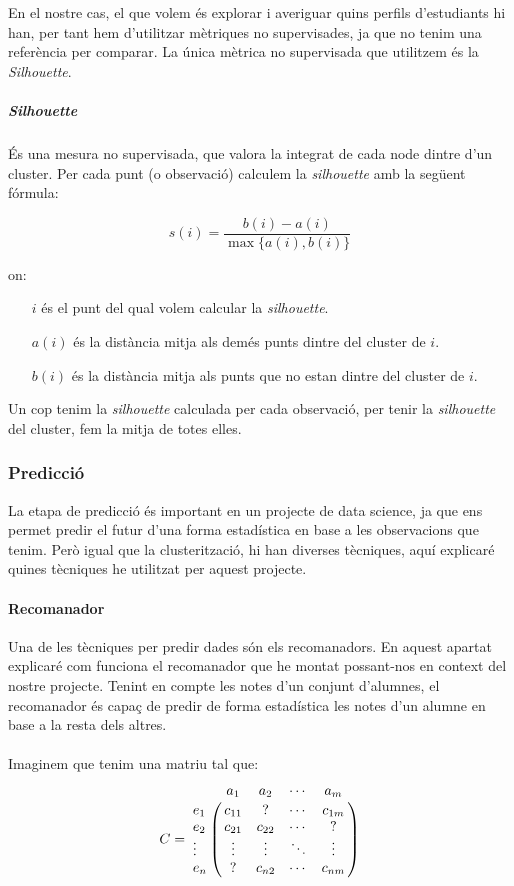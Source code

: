 \documentclass[11pt,a4paper,catalan]{article}
\begin{document}
En el nostre cas, el que volem és explorar i averiguar quins perfils d'estudiants hi han, per tant hem d'utilitzar mètriques no supervisades, ja que no tenim una referència per comparar. La única mètrica no supervisada que utilitzem és la \textit{Silhouette}.

\subparagraph{\textit{Silhouette}}
És una mesura no supervisada, que valora la integrat de cada node dintre d'un cluster. Per cada punt (o observació) calculem la \textit{silhouette} amb la següent fórmula:

$$ s(i) = \frac{b(i) - a(i)}{\max\{a(i),b(i)\}} $$

on:
\begin{itemize}[leftmargin=.5in]
	\item [$i$] és el punt del qual volem calcular la \textit{silhouette}.
	\item [$a(i)$] és la distància mitja als demés punts dintre del cluster de $i$.
	\item [$b(i)$] és la distància mitja als punts que no estan dintre del cluster de $i$.
\end{itemize}

Un cop tenim la \textit{silhouette} calculada per cada observació, per tenir la \textit{silhouette} del cluster, fem la mitja de totes elles.

\newpage

\subsubsection{Predicció}
La etapa de predicció és important en un projecte de data science, ja que ens permet predir el futur d'una forma estadística en base a les observacions que tenim. Però igual que la clusterització, hi han diverses tècniques, aquí explicaré quines tècniques he utilitzat per aquest projecte.

\paragraph{Recomanador}
Una de les tècniques per predir dades són els recomanadors. En aquest apartat explicaré com funciona el recomanador que he montat possant-nos en context del nostre projecte. Tenint en compte les notes d'un conjunt d'alumnes, el recomanador és capaç de predir de forma estadística les notes d'un alumne en base a la resta dels altres.
\\
\\
Imaginem que tenim una matriu tal que:
$$
C = \bordermatrix{~ &         a_1   &    a_2   &   \cdots    &    a_m  \cr
                  e_1    &  c_{11}  &     ?    &   \cdots    &  c_{1m} \cr
                  e_2    &  c_{21}  &  c_{22}  &   \cdots    &    ?    \cr
                  \vdots &  \vdots  &  \vdots  &   \ddots    &  \vdots \cr
                  e_n    &    ?     &  c_{n2}  &   \cdots    &  c_{nm} \cr
                  }
$$
\end{document}
